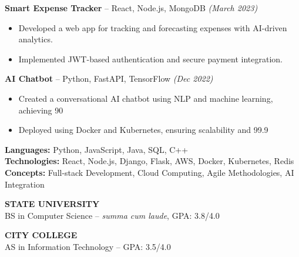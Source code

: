 \documentclass[a4paper,10.5pt]{article}
\newcommand{\customsection}[1]{
    \vspace{1pt} %
    \noindent\colorbox{headerblue}{
        \makebox[\dimexpr\textwidth-2\fboxsep\relax]{
            \textcolor{white}{\textbf{\large #1}} %
        }
    }
    \vspace{-2pt} %
}
\begin{document}
\textbf{Smart Expense Tracker} -- React, Node.js, MongoDB \hfill \textit{(March 2023)}
\begin{itemize}\setlength{\itemsep}{1pt}
    \item Developed a web app for tracking and forecasting expenses with AI-driven analytics.
    \item Implemented JWT-based authentication and secure payment integration.
\end{itemize}

\textbf{AI Chatbot} -- Python, FastAPI, TensorFlow \hfill \textit{(Dec 2022)}
\begin{itemize}\setlength{\itemsep}{1pt}
    \item Created a conversational AI chatbot using NLP and machine learning, achieving 90%
    \item Deployed using Docker and Kubernetes, ensuring scalability and 99.9%
\end{itemize}

\customsection{SKILLS}

\textbf{Languages:} Python, JavaScript, Java, SQL, C++\\
\textbf{Technologies:} React, Node.js, Django, Flask, AWS, Docker, Kubernetes, Redis\\
\textbf{Concepts:} Full-stack Development, Cloud Computing, Agile Methodologies, AI Integration

\customsection{EDUCATION}

\textbf{STATE UNIVERSITY}\\
BS in Computer Science -- \textit{summa cum laude}, GPA: 3.8/4.0

\textbf{CITY COLLEGE}\\
AS in Information Technology -- GPA: 3.5/4.0
\end{document}
